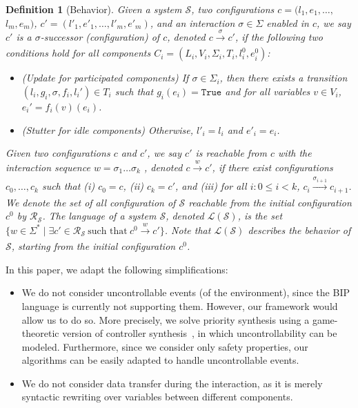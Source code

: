 \documentclass[10pt, a4paper, onecolumn, conference, compsocconf]{IEEEtran}
\newcommand{\true}{\texttt{True}}
\newcommand{\initloc}[1]{l^0_{#1}}
\newcommand{\initeval}[1]{e^0_{#1}}
\newcommand{\initconf}{c^0}
\newcommand{\system}{\mathcal{S}}
\newcommand{\lang}{\mathcal{L}(\system)\xspace}
\newcommand{\reach}{\mathcal{R}_{\system}\xspace}
\newtheorem{defi}{Definition}
\begin{document}
\begin{defi}[Behavior]
  Given a system $\mathcal{S}$, two configurations $c=(l_1, e_1, \ldots,$ $l_m, e_m)$, $c'=(l'_1, e'_1, \ldots, l'_m, e'_m)$, and an interaction $\sigma\in\Sigma$ enabled in $c$, we say \emph{$c'$ is a $\sigma$-successor (configuration) of $c$}, denoted $c \xrightarrow[]{\sigma} c'$, if the following two conditions hold for all components $C_i =(L_i, V_i, \Sigma_i, T_i, \initloc{i}, \initeval{i})$:
\begin{itemize}
\item (Update for participated components) If $\sigma \in \Sigma_i$, then there exists a transition $(l_i,g_i,\sigma,f_i,l_i') \in T_i$ such that $g_i(e_i) = \true$ and for all variables $v\in V_i$, $e_i' = f_i(v)(e_i)$.
\item (Stutter for idle components) Otherwise, $l'_i = l_i$ and $e'_i = e_i$.
\end{itemize}

Given two configurations $c$ and $c'$, we say \emph{$c'$ is reachable from $c$} with the interaction sequence $w=\sigma_1 \ldots \sigma_k$ , denoted $c \xrightarrow[]{w} c'$, if there exist configurations $c_0,\dots,c_{k}$ such that (i) $c_0 = c$,
(ii) $c_{k} = c'$, and (iii) for all  $i: 0\le i < k$, $c_i \xrightarrow[]{\sigma_{i+1}} c_{i+1}$.
We denote the set of all configuration of $\mathcal{S}$ reachable from the initial configuration $c^0$ by $\reach$.
The \emph{language} of a system $\mathcal{S}$, denoted $\lang$, is the set $\{w \in \Sigma^{*}\mid\exists c' \in \reach~\text{such that}~\initconf \xrightarrow[]{w} c'\}$.  Note that $\lang$ describes the behavior of $\mathcal{S}$, starting from the initial configuration $\initconf$.
\end{defi}

\noindent In this paper, we adapt the following simplifications:
\begin{itemize}
\item We do not consider uncontrollable events (of the environment), since the BIP language is currently not supporting them.
However, our framework would allow us to do so.  More precisely, we solve priority synthesis using a game-theoretic version of controller synthesis~\cite{ramadge1989control}, in which uncontrollability can be modeled. Furthermore, since we consider only safety properties, our algorithms can be easily adapted to handle uncontrollable events.  \item We do not consider data transfer during the interaction, as it is merely syntactic rewriting over variables between different components.  \end{itemize}
\end{document}
